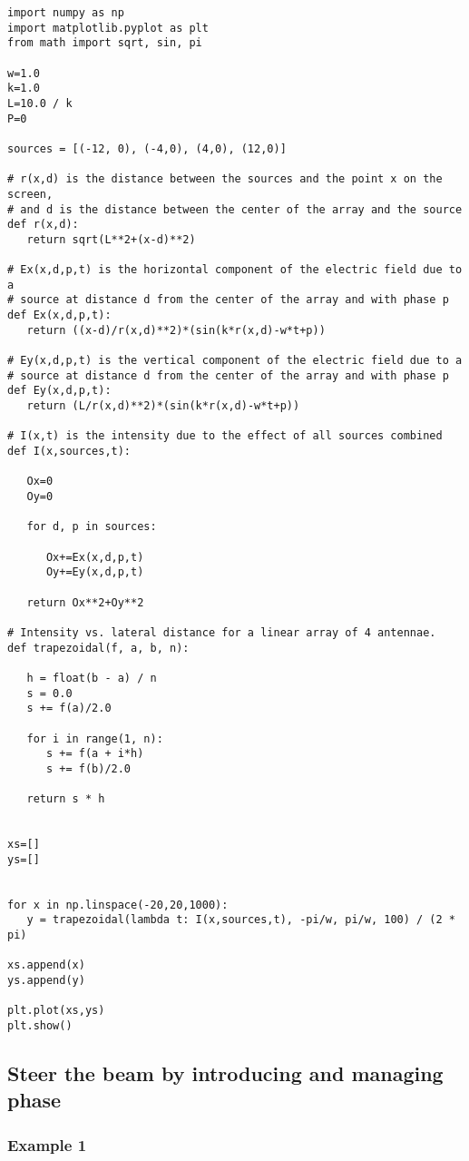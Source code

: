 \begin{Verbatim}[fontsize=\small,baselinestretch=0.9]
import numpy as np
import matplotlib.pyplot as plt
from math import sqrt, sin, pi

w=1.0
k=1.0
L=10.0 / k
P=0

sources = [(-12, 0), (-4,0), (4,0), (12,0)]

# r(x,d) is the distance between the sources and the point x on the screen,
# and d is the distance between the center of the array and the source
def r(x,d):
   return sqrt(L**2+(x-d)**2)

# Ex(x,d,p,t) is the horizontal component of the electric field due to a
# source at distance d from the center of the array and with phase p
def Ex(x,d,p,t):
   return ((x-d)/r(x,d)**2)*(sin(k*r(x,d)-w*t+p))

# Ey(x,d,p,t) is the vertical component of the electric field due to a
# source at distance d from the center of the array and with phase p
def Ey(x,d,p,t):
   return (L/r(x,d)**2)*(sin(k*r(x,d)-w*t+p))

# I(x,t) is the intensity due to the effect of all sources combined
def I(x,sources,t):

   Ox=0
   Oy=0

   for d, p in sources:

      Ox+=Ex(x,d,p,t)
      Oy+=Ey(x,d,p,t)

   return Ox**2+Oy**2

# Intensity vs. lateral distance for a linear array of 4 antennae.
def trapezoidal(f, a, b, n):

   h = float(b - a) / n
   s = 0.0
   s += f(a)/2.0

   for i in range(1, n):
      s += f(a + i*h)
      s += f(b)/2.0

   return s * h


xs=[]
ys=[]


for x in np.linspace(-20,20,1000):
   y = trapezoidal(lambda t: I(x,sources,t), -pi/w, pi/w, 100) / (2 * pi)

xs.append(x)
ys.append(y)

plt.plot(xs,ys)
plt.show()   
\end{Verbatim}

\subsection{Steer the beam by introducing and managing phase}

\subsubsection{Example 1}\label{code:phase_right}

